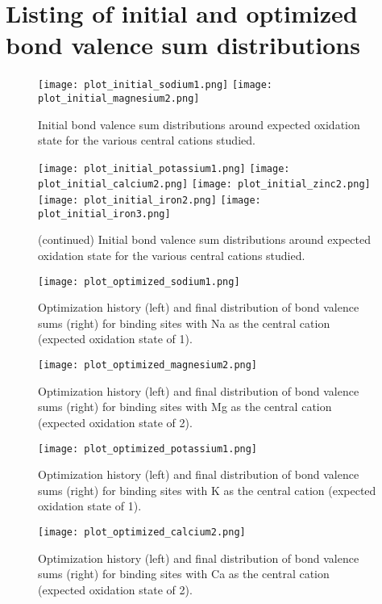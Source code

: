 \documentclass{article}
\begin{document}
\section{Listing of initial and optimized bond valence sum distributions}

\begin{figure}[h!]
\texttt{[image: plot\_initial\_sodium1.png]}
\texttt{[image: plot\_initial\_magnesium2.png]}
\caption{Initial bond valence sum distributions around expected oxidation state for the various central cations studied.}
\end{figure}
\setcounter{figure}{0}
\begin{figure}[h!]
\texttt{[image: plot\_initial\_potassium1.png]}
\texttt{[image: plot\_initial\_calcium2.png]}
\texttt{[image: plot\_initial\_zinc2.png]}
\texttt{[image: plot\_initial\_iron2.png]}
\texttt{[image: plot\_initial\_iron3.png]}
\caption{(continued) Initial bond valence sum distributions around expected oxidation state for the various central cations studied.}
\end{figure}

\begin{figure}[h!]
\texttt{[image: plot\_optimized\_sodium1.png]}
\caption{Optimization history (left) and final distribution of bond valence sums (right) for binding sites with Na as the central cation (expected oxidation state of 1).}
\end{figure}

\begin{figure}[h!]
\texttt{[image: plot\_optimized\_magnesium2.png]}
\caption{Optimization history (left) and final distribution of bond valence sums (right) for binding sites with Mg as the central cation (expected oxidation state of 2).}
\end{figure}

\begin{figure}[h!]
\texttt{[image: plot\_optimized\_potassium1.png]}
\caption{Optimization history (left) and final distribution of bond valence sums (right) for binding sites with K as the central cation (expected oxidation state of 1).}
\end{figure}

\begin{figure}[h!]
\texttt{[image: plot\_optimized\_calcium2.png]}
\caption{Optimization history (left) and final distribution of bond valence sums (right) for binding sites with Ca as the central cation (expected oxidation state of 2).}
\end{figure}
\end{document}
